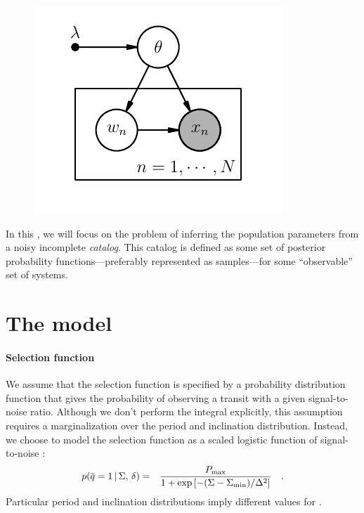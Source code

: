\documentclass[12pt,preprint]{aastex}
\begin{document}
\begin{figure}[htbp]
\begin{center}
    \includegraphics{abstract.pdf}
\end{center}
\caption{%
}
\end{figure}

In this \paper, we will focus on the problem of inferring the population
parameters from a noisy incomplete \emph{catalog}.
This catalog is defined as some set of posterior probability
functions---preferably represented as samples---for some ``observable'' set of
systems.

\section{The model}

\paragraph{Selection function}
We assume that the selection function is specified by a probability
distribution function that gives the probability of observing a transit with a
given signal-to-noise ratio.
Although we don't perform the integral explicitly, this assumption requires a
marginalization over the period and inclination distribution.
Instead, we choose to model the selection function as a scaled logistic
function of signal-to-noise \sn:
\begin{eqnarray}
p(\overline{q}=1\,|\,\Sigma,\,\delta) &=&
\frac{P_\mathrm{max}}{1+\exp \left [ -(\Sigma-\Sigma_\mathrm{min}) / \Delta^2 \right ]} \quad.
\end{eqnarray}
Particular period and inclination distributions imply different values for
\Pmax.
\end{document}

